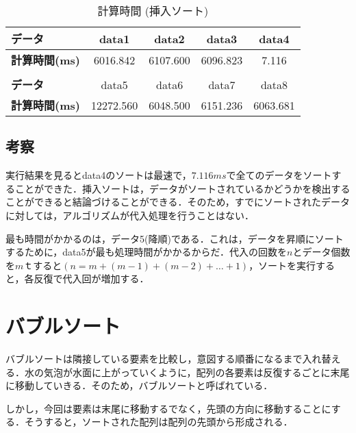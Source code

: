 \documentclass[a4j, titlepage]{jarticle}
\begin{document}
            \begin{table}[tbh]
                \caption{計算時間 (挿入ソート)}
                \label{tab:insertion}
                \begin{center}
                    \begin{tabular}{lcccc}
                        \hline
                        \textbf{データ} & data1 & data2 &data3 &data4 \\ \hline
                        \textbf{計算時間(ms)} & 6016.842 & 6107.600 & 6096.823 & 7.116\\ \hline
                        \\ \hline
                        \textbf{データ} & data5 &data6 &data7 &data8\\ \hline
                        \textbf{計算時間(ms)} & 12272.560 & 6048.500 & 6151.236 & 6063.681\\ \hline
                    \end{tabular}
                \end{center}
            \end{table}
        
        \subsection{考察}
            実行結果を見るとdata4のソートは最速で，$7.116ms$で全てのデータをソートすることができた．挿入ソートは，データがソートされているかどうかを検出することができると結論づけることができる．そのため，すでにソートされたデータに対しては，アルゴリズムが代入処理を行うことはない．
            
            最も時間がかかるのは，データ5(降順)である．これは，データを昇順にソートするために，data5が最も処理時間がかかるからだ．代入の回数を$n$とデータ個数を$m$ｔすると$( n = m + (m-1) + (m-2) + \dots + 1)$，ソートを実行すると，各反復で代入回が増加する．


    \section{バブルソート}
        バブルソートは隣接している要素を比較し，意図する順番になるまで入れ替える．水の気泡が水面に上がっていくように，配列の各要素は反復するごとに末尾に移動していきる．そのため，バブルソートと呼ばれている．

        しかし，今回は要素は末尾に移動するでなく，先頭の方向に移動することにする．そうすると，ソートされた配列は配列の先頭から形成される．
\end{document}
